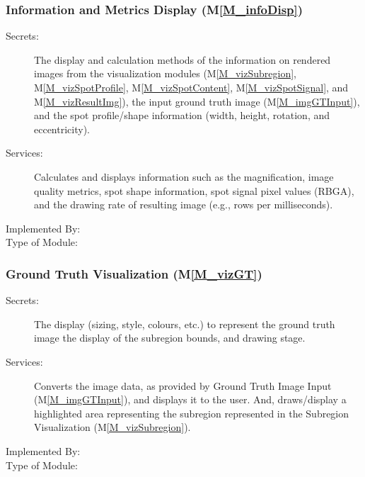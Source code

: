 \documentclass[12pt, titlepage]{article}
\newcommand{\mref}[1]{M\ref{#1}}
\begin{document}
\subsubsection{Information and Metrics Display (\mref{M_infoDisp})}
\begin{description}
\item[Secrets:]The display and calculation methods of the information on rendered
  images from the visualization modules (\mref{M_vizSubregion}, \mref{M_vizSpotProfile},
  \mref{M_vizSpotContent}, \mref{M_vizSpotSignal}, and \mref{M_vizResultImg}),
  the input ground truth image (\mref{M_imgGTInput}), and the spot profile/shape 
  information (width, height, rotation, and eccentricity).
\item[Services:]Calculates and displays information such as the magnification,
  image quality metrics, spot shape information, spot signal pixel values (RBGA),
  and the drawing rate of resulting image (e.g., rows per milliseconds).
\item[Implemented By:] \progname{}
\item[Type of Module:] 
\end{description}


\subsubsection{Ground Truth Visualization (\mref{M_vizGT})}
\begin{description}
\item[Secrets:]The display (sizing, style, colours, etc.) to represent the ground truth image
  the display of the subregion bounds, and drawing stage.
\item[Services:]Converts the image data, as provided by Ground Truth Image Input (\mref{M_imgGTInput}),
  and displays it to the user. And, draws/display a highlighted area representing the subregion
  represented in the Subregion Visualization (\mref{M_vizSubregion}).
\item[Implemented By:] \progname{}
\item[Type of Module:] 
\end{description}
\end{document}
